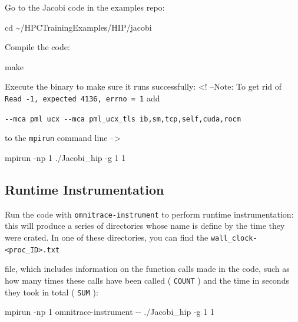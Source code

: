 \documentclass[
]{article}
\let\oldtexttt\texttt
\renewcommand{\texttt}[1]{
  \colorbox{Light}{\oldtexttt{#1}}
}
\newenvironment{Shaded}{}{}
\newcommand{\BuiltInTok}[1]{#1}
\newcommand{\ExtensionTok}[1]{#1}
\newcommand{\FunctionTok}[1]{\textcolor[rgb]{0.02,0.16,0.49}{#1}}
\newcommand{\NormalTok}[1]{#1}
\begin{document}
Go to the Jacobi code in the examples repo:

\begin{Shaded}
\begin{Highlighting}[]
\BuiltInTok{cd}\NormalTok{ \textasciitilde{}/HPCTrainingExamples/HIP/jacobi}
\end{Highlighting}
\end{Shaded}

Compile the code:

\begin{Shaded}
\begin{Highlighting}[]
\FunctionTok{make}
\end{Highlighting}
\end{Shaded}

Execute the binary to make sure it runs successfully: \textless! --Note:
To get rid of \texttt{Read\ -1,\ expected\ 4136,\ errno\ =\ 1} add
\texttt{-\/-mca\ pml\ ucx\ -\/-mca\ pml\_ucx\_tls\ ib,sm,tcp,self,cuda,rocm}
to the \texttt{mpirun} command line --\textgreater{}

\begin{Shaded}
\begin{Highlighting}[]
\ExtensionTok{mpirun}\NormalTok{ {-}np 1 ./Jacobi\_hip {-}g 1 1}
\end{Highlighting}
\end{Shaded}

\hypertarget{runtime-instrumentation}{%
\subsection{Runtime Instrumentation}\label{runtime-instrumentation}}

Run the code with \texttt{omnitrace-instrument} to perform runtime
instrumentation: this will produce a series of directories whose name is
define by the time they were crated. In one of these directories, you
can find the \texttt{wall\_clock-\textless{}proc\_ID\textgreater{}.txt}
file, which includes information on the function calls made in the code,
such as how many times these calls have been called (\texttt{COUNT}) and
the time in seconds they took in total (\texttt{SUM}):

\begin{Shaded}
\begin{Highlighting}[]
\ExtensionTok{mpirun}\NormalTok{ {-}np 1 omnitrace{-}instrument {-}{-} ./Jacobi\_hip {-}g 1 1}
\end{Highlighting}
\end{Shaded}
\end{document}

